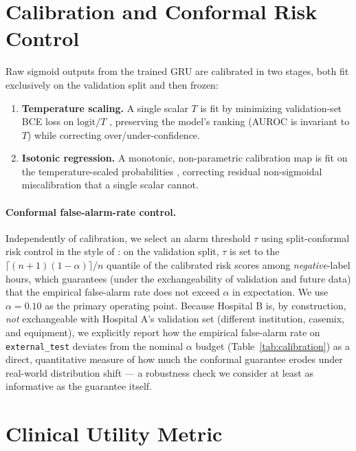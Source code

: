 \documentclass[11pt]{article}
\begin{document}
\section{Calibration and Conformal Risk Control}
\label{sec:calibration}

Raw sigmoid outputs from the trained GRU are calibrated in two stages, both fit exclusively on the validation split and then frozen:

\begin{enumerate}[leftmargin=*]
    \item \textbf{Temperature scaling.} A single scalar $T$ is fit by minimizing validation-set BCE loss on $\text{logit}/T$ \citep{guo2017calibration}, preserving the model's ranking (AUROC is invariant to $T$) while correcting over/under-confidence.
    \item \textbf{Isotonic regression.} A monotonic, non-parametric calibration map is fit on the temperature-scaled probabilities \citep{platt1999probabilistic}, correcting residual non-sigmoidal miscalibration that a single scalar cannot.
\end{enumerate}

\paragraph{Conformal false-alarm-rate control.} Independently of calibration, we select an alarm threshold $\tau$ using split-conformal risk control in the style of \citet{angelopoulos2022conformal}: on the validation split, $\tau$ is set to the $\lceil (n+1)(1-\alpha)\rceil / n$ quantile of the calibrated risk scores among \emph{negative}-label hours, which guarantees (under the exchangeability of validation and future data) that the empirical false-alarm rate does not exceed $\alpha$ in expectation. We use $\alpha = 0.10$ as the primary operating point. Because Hospital B is, by construction, \emph{not} exchangeable with Hospital A's validation set (different institution, casemix, and equipment), we explicitly report how the empirical false-alarm rate on \texttt{external\_test} deviates from the nominal $\alpha$ budget (Table~\ref{tab:calibration}) as a direct, quantitative measure of how much the conformal guarantee erodes under real-world distribution shift --- a robustness check we consider at least as informative as the guarantee itself.

\section{Clinical Utility Metric}
\label{sec:utility}
\end{document}
